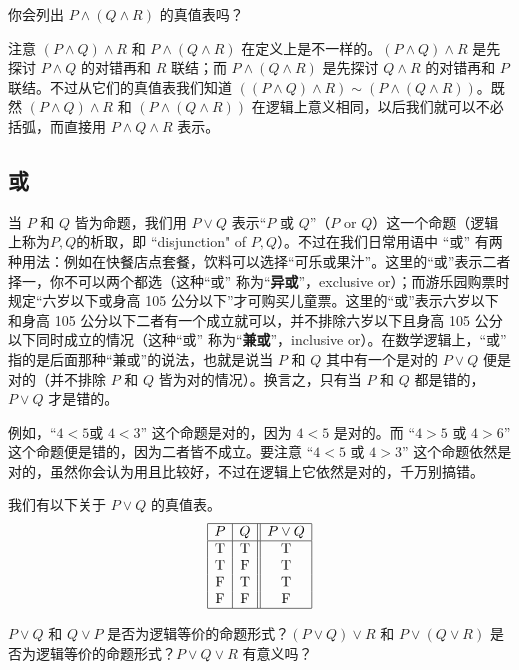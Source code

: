 \begin{question}
你会列出 \(P \land (Q \land R)\) 的真值表吗？
\end{question}

注意 \((P\land Q)\land R\) 和 \(P\land (Q\land R)\) 在定义上是不一样的。\((P\land Q)\land R\) 是先探讨 \(P\land Q\) 的对错再和 \(R\) 联结；而 \(P\land (Q\land R)\) 是先探讨 \(Q\land R\) 的对错再和 \(P\) 联结。不过从它们的真值表我们知道 \(((P\land Q)\land R)\sim (P\land (Q\land R))\)。既然 \((P\land Q)\land R\) 和 \((P\land (Q\land R))\) 在逻辑上意义相同，以后我们就可以不必括弧，而直接用 \(P\land Q\land R\) 表示。

\subsection{或}
当 \(P\) 和 \(Q\) 皆为命题，我们用 \(P\lor Q\) 表示“\(P\) 或 \(Q\)”（\(P\) or \(Q\)）这一个命题（逻辑上称为\(P, Q\)的析取，即 ``disjunction" of \(P, Q\)）。不过在我们日常用语中 “或” 有两种用法：例如在快餐店点套餐，饮料可以选择“可乐或果汁”。这里的“或”表示二者择一，你不可以两个都选（这种“或” 称为“{\bf 异或}”，exclusive or）；而游乐园购票时规定“六岁以下或身高 105 公分以下”才可购买儿童票。这里的“或”表示六岁以下和身高 105 公分以下二者有一个成立就可以，并不排除六岁以下且身高 105 公分以下同时成立的情况（这种“或” 称为“{\bf 兼或}”，inclusive or）。在数学逻辑上，“或” 指的是后面那种“兼或”的说法，也就是说当 \(P\) 和 \(Q\) 其中有一个是对的 \(P\lor Q\) 便是对的（并不排除 \(P\) 和 \(Q\) 皆为对的情况）。换言之，只有当 \(P\) 和 \(Q\) 都是错的，\(P\lor Q\) 才是错的。

例如，“\(4< 5\)或 \(4< 3\)” 这个命题是对的，因为 \(4< 5\) 是对的。而 “\(4 > 5\) 或  \(4 > 6\)” 这个命题便是错的，因为二者皆不成立。要注意 “\(4< 5\) 或  \(4 > 3\)” 这个命题依然是对的，虽然你会认为用且比较好，不过在逻辑上它依然是对的，千万别搞错。

我们有以下关于 \(P\lor Q\) 的真值表。
\[
\begin{array}{|c|c||c|}
\hline
P & Q & P\lor Q \\
\hline
\mathrm{T} & \mathrm{T} & \mathrm{T} \\
\mathrm{T} & \mathrm{F} & \mathrm{T} \\
\mathrm{F} & \mathrm{T} & \mathrm{T} \\
\mathrm{F} & \mathrm{F} & \mathrm{F} \\
\hline
\end{array}
\]

\begin{question}
\(P\lor Q\) 和 \(Q\lor P\) 是否为逻辑等价的命题形式？\((P\lor Q)\lor R\) 和 \(P\lor (Q\lor R)\) 是否为逻辑等价的命题形式？\(P\lor Q\lor R\) 有意义吗？
\end{question}

